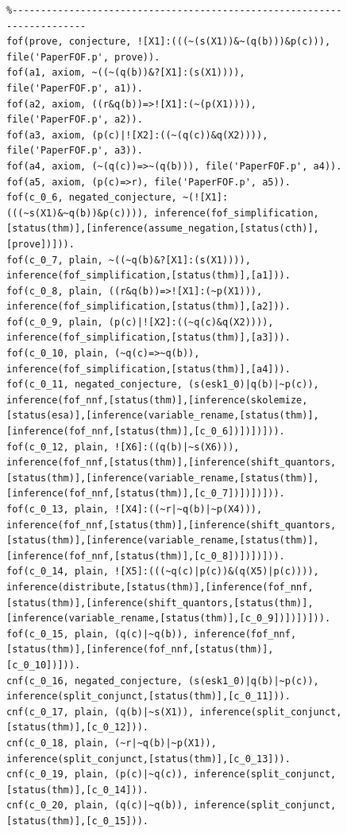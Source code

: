 \documentclass[runningheads]{llncs}
\begin{document}
\begin{figure}[htb]
\centering
{\footnotesize
{\setlength{\baselineskip}{3mm}
\begin{verbatim}
%------------------------------------------------------------------------
fof(prove, conjecture, ![X1]:(((~(s(X1))&~(q(b)))&p(c))), file('PaperFOF.p', prove)).
fof(a1, axiom, ~((~(q(b))&?[X1]:(s(X1)))), file('PaperFOF.p', a1)).
fof(a2, axiom, ((r&q(b))=>![X1]:(~(p(X1)))), file('PaperFOF.p', a2)).
fof(a3, axiom, (p(c)|![X2]:((~(q(c))&q(X2)))), file('PaperFOF.p', a3)).
fof(a4, axiom, (~(q(c))=>~(q(b))), file('PaperFOF.p', a4)).
fof(a5, axiom, (p(c)=>r), file('PaperFOF.p', a5)).
fof(c_0_6, negated_conjecture, ~(![X1]:(((~s(X1)&~q(b))&p(c)))), inference(fof_simplification,[status(thm)],[inference(assume_negation,[status(cth)],[prove])])).
fof(c_0_7, plain, ~((~q(b)&?[X1]:(s(X1)))), inference(fof_simplification,[status(thm)],[a1])).
fof(c_0_8, plain, ((r&q(b))=>![X1]:(~p(X1))), inference(fof_simplification,[status(thm)],[a2])).
fof(c_0_9, plain, (p(c)|![X2]:((~q(c)&q(X2)))), inference(fof_simplification,[status(thm)],[a3])).
fof(c_0_10, plain, (~q(c)=>~q(b)), inference(fof_simplification,[status(thm)],[a4])).
fof(c_0_11, negated_conjecture, (s(esk1_0)|q(b)|~p(c)), inference(fof_nnf,[status(thm)],[inference(skolemize,[status(esa)],[inference(variable_rename,[status(thm)],[inference(fof_nnf,[status(thm)],[c_0_6])])])])).
fof(c_0_12, plain, ![X6]:((q(b)|~s(X6))), inference(fof_nnf,[status(thm)],[inference(shift_quantors,[status(thm)],[inference(variable_rename,[status(thm)],[inference(fof_nnf,[status(thm)],[c_0_7])])])])).
fof(c_0_13, plain, ![X4]:((~r|~q(b)|~p(X4))), inference(fof_nnf,[status(thm)],[inference(shift_quantors,[status(thm)],[inference(variable_rename,[status(thm)],[inference(fof_nnf,[status(thm)],[c_0_8])])])])).
fof(c_0_14, plain, ![X5]:(((~q(c)|p(c))&(q(X5)|p(c)))), inference(distribute,[status(thm)],[inference(fof_nnf,[status(thm)],[inference(shift_quantors,[status(thm)],[inference(variable_rename,[status(thm)],[c_0_9])])])])).
fof(c_0_15, plain, (q(c)|~q(b)), inference(fof_nnf,[status(thm)],[inference(fof_nnf,[status(thm)],[c_0_10])])).
cnf(c_0_16, negated_conjecture, (s(esk1_0)|q(b)|~p(c)), inference(split_conjunct,[status(thm)],[c_0_11])).
cnf(c_0_17, plain, (q(b)|~s(X1)), inference(split_conjunct,[status(thm)],[c_0_12])).
cnf(c_0_18, plain, (~r|~q(b)|~p(X1)), inference(split_conjunct,[status(thm)],[c_0_13])).
cnf(c_0_19, plain, (p(c)|~q(c)), inference(split_conjunct,[status(thm)],[c_0_14])).
cnf(c_0_20, plain, (q(c)|~q(b)), inference(split_conjunct,[status(thm)],[c_0_15])).

\end{verbatim}}}
\end{figure}
\end{document}
